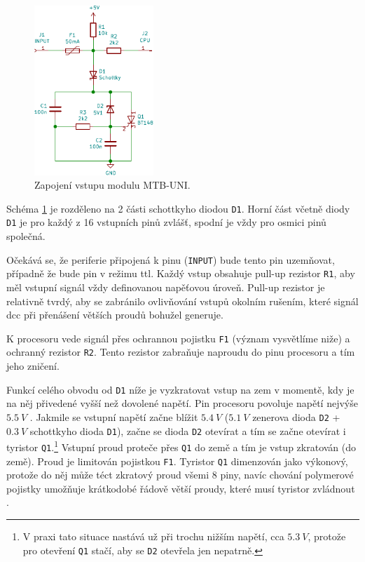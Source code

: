\begin{figure}[ht]
\includegraphics[width=0.4\textwidth]{data/uni-input/uni-input.pdf}
\caption{Zapojení vstupu modulu MTB-UNI.}
\label{fig:mtbuni-input}
\end{figure}

Schéma \ref{fig:mtbuni-input} je rozděleno na 2 části schottkyho diodou
\texttt{D1}. Horní část včetně diody \texttt{D1} je pro každý z 16 vstupních
pinů zvlášť, spodní je vždy pro osmici pinů společná.

Očekává se, že periferie připojená k pinu (\texttt{INPUT}) bude tento pin
uzemňovat, případně že bude pin v režimu \gls{ttl}. Každý vstup obsahuje
pull-up rezistor \texttt{R1}, aby měl vstupní signál vždy definovanou napěťovou
úroveň. Pull-up rezistor je relativně tvrdý, aby se zabránilo ovlivňování
vstupů okolním rušením, které signál \gls{dcc} při přenášení větších proudů
bohužel generuje.

K procesoru vede signál přes ochrannou pojistku \texttt{F1} (význam vysvětlíme
niže) a ochranný rezistor \texttt{R2}. Tento rezistor zabraňuje naproudu do pinu
procesoru a tím jeho zničení.

Funkcí celého obvodu od \texttt{D1} níže je vyzkratovat vstup na zem v momentě,
kdy je na něj přivedené vyšší než dovolené napětí. Pin procesoru povoluje
napětí nejvýše $5.5~V$ \cite{atmega128-datasheet}. Jakmile se vstupní napětí
začne blížit $5.4~V$ ($5.1~V$ zenerova dioda \texttt{D2} + $0.3~V$ schottkyho
dioda \texttt{D1}), začne se dioda \texttt{D2} otevírat a tím se začne otevírat
i tyristor \texttt{Q1}.\footnote{V praxi tato situace nastává už při trochu
nižším napětí, cca $5.3~V$, protože pro otevření \texttt{Q1} stačí, aby se
\texttt{D2} otevřela jen nepatrně.} Vstupní proud proteče přes \texttt{Q1} do
země a tím je vstup zkratován (do země). Proud je limitován pojistkou \texttt{F1}.
Tyristor \texttt{Q1} dimenzován jako výkonový, protože do něj může téct zkratový
proud všemi 8 piny, navíc chování polymerové pojistky umožňuje krátkodobé řádově
větší proudy, které musí tyristor zvládnout \cite{polyfuse-behavior}.

